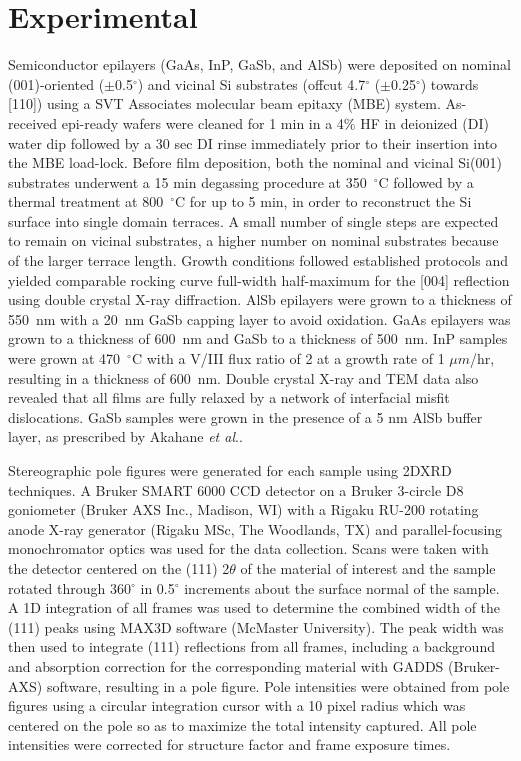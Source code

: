 \section{Experimental}
Semiconductor epilayers (GaAs, InP, GaSb, and AlSb) were deposited on nominal (001)-oriented ($\pm$0.5$^\circ$) and vicinal Si substrates (offcut 4.7$^\circ$ ($\pm$0.25$^\circ$) towards [110]) using a SVT Associates molecular beam epitaxy (MBE) system. As-received epi-ready wafers were cleaned for 1 min in a 4\% HF in deionized (DI) water dip followed by a 30 sec DI rinse immediately prior to their insertion into the MBE load-lock. Before film deposition, both the nominal and vicinal Si(001) substrates underwent a 15 min degassing procedure at 350~$^\circ$C followed by a thermal treatment at 800~$^\circ$C for up to 5 min, in order to reconstruct the Si surface into single domain terraces\cite{NeergaardWaltenburg1995,S1991,Sakamoto1986,Pehlke1991}. A small number of single steps are expected to remain on vicinal substrates, a higher number on nominal substrates because of the larger terrace length. Growth conditions followed established protocols\cite{Akahane2004,Balakrishnan2006a,Fischer1986} and yielded comparable rocking curve full-width half-maximum for the [004] reflection using double crystal X-ray diffraction. AlSb epilayers were grown to a thickness of 550~nm with a 20~nm GaSb capping layer to avoid oxidation. GaAs epilayers was grown to a thickness of 600~nm and GaSb to a thickness of 500~nm. InP samples were grown at 470~$^\circ$C with a V/III flux ratio of 2 at a growth rate of 1 $\mu m$/hr, resulting in a thickness of 600~nm. Double crystal X-ray and TEM data also revealed that all films are fully relaxed by a network of interfacial misfit dislocations\cite{Vajargah2011}. GaSb samples were grown in the presence of a 5 nm AlSb buffer layer, as prescribed by Akahane \textit{et al}.\cite{Akahane2004}.

Stereographic pole figures were generated for each sample using 2DXRD techniques. A Bruker SMART 6000 CCD detector on a Bruker 3-circle D8 goniometer (Bruker AXS Inc., Madison, WI) with a Rigaku RU-200 rotating anode X-ray generator (Rigaku MSc, The Woodlands, TX) and parallel-focusing monochromator optics was used for the data collection. Scans were taken with the detector centered on the (111) 2$\theta$ of the material of interest and the sample rotated through 360$^\circ$ in 0.5$^\circ$ increments about the surface normal of the sample. A 1D integration of all frames was used to determine the combined width of the (111) peaks using MAX3D software (McMaster University)\cite{Britten2007}. The peak width was then used to integrate (111) reflections from all frames, including a background and absorption correction for the corresponding material with GADDS (Bruker-AXS) software, resulting in a pole figure. Pole intensities were obtained from pole figures using a circular integration cursor with a 10 pixel radius which was centered on the pole so as to maximize the total intensity captured. All pole intensities were corrected for structure factor and frame exposure times.

